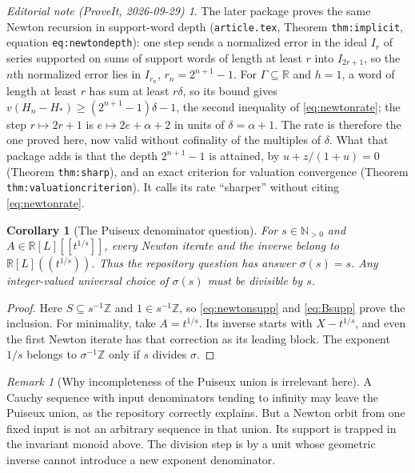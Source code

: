 \documentclass[11pt,a4paper]{article}
\newtheorem{corollary}[theorem]{Corollary}
\theoremstyle{definition}
\theoremstyle{remark}
\newtheorem{remark}[theorem]{Remark}
\newtheorem*{ednote}{Editorial note (ProveIt, 2026-09-29)}
\newcommand{\R}{\mathbb R}
\newcommand{\Z}{\mathbb Z}
\newcommand{\N}{\mathbb N}
\begin{document}
\begin{ednote}\label{ed:newton-depth}
The later package
proves the same Newton recursion in support-word depth
(\texttt{article.tex}, Theorem \texttt{thm:implicit}, equation
\texttt{eq:newtondepth}): one step sends a normalized error in the
ideal $I_r$ of series supported on sums of support words of length at
least $r$ into $I_{2r+1}$, so
the $n$th normalized error lies in $I_{r_n}$, $r_n=2^{n+1}-1$. For
$\Gamma\subseteq\R$ and $h=1$, a word of length at least $r$ has sum at
least $r\delta$, so its bound gives $v(H_n-H_*)\ge(2^{n+1}-1)\delta-1$,
the second inequality of \eqref{eq:newtonrate}; the step $r\mapsto2r+1$ is
$e\mapsto2e+\alpha+2$ in units of $\delta=\alpha+1$. The rate is therefore
the one proved here, now valid without cofinality of the multiples of
$\delta$. What that package adds is that the depth $2^{n+1}-1$ is attained,
by $u+z/(1+u)=0$ (Theorem \texttt{thm:sharp}), and an exact criterion for
valuation convergence (Theorem \texttt{thm:valuationcriterion}). It
calls its rate ``sharper'' without citing \eqref{eq:newtonrate}.
\end{ednote}

\begin{corollary}[The Puiseux denominator question]\label{cor:puiseux}
For $s\in\N_{>0}$ and $A\in\R[L][[t^{1/s}]]$, every Newton iterate and
the inverse belong to $\R[L]((t^{1/s}))$. Thus the repository question has
answer $\sigma(s)=s$. Any integer-valued universal choice of $\sigma(s)$
must be divisible by $s$.
\end{corollary}
\begin{proof}
Here $S\subseteq s^{-1}\Z$ and $1\in s^{-1}\Z$, so
\eqref{eq:newtonsupp} and \eqref{eq:Bsupp} prove the inclusion. For minimality,
take $A=t^{1/s}$. Its inverse starts with $X-t^{1/s}$, and even the first
Newton iterate has that correction as its leading block. The exponent
$1/s$ belongs to $\sigma^{-1}\Z$ only if $s$ divides $\sigma$.
\end{proof}

\begin{remark}[Why incompleteness of the Puiseux union is irrelevant here]
A Cauchy sequence with input denominators tending to infinity may leave the
Puiseux union, as the repository correctly explains. But a Newton orbit
from one fixed input is not an arbitrary sequence in that union. Its
support is trapped in the invariant monoid above. The division step is by a
unit whose geometric inverse cannot introduce a new exponent denominator.
\end{remark}
\end{document}
